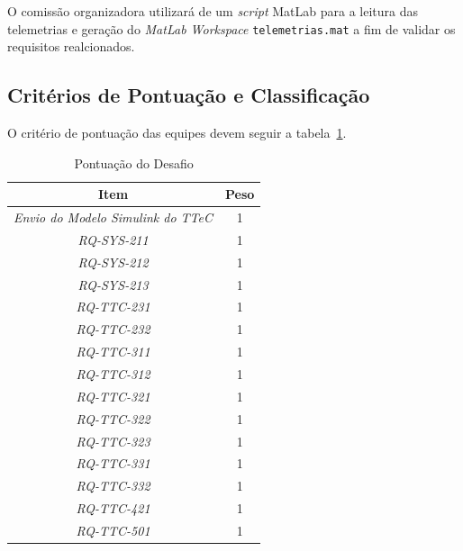 O comissão organizadora utilizará de um \textit{script} MatLab para a leitura das telemetrias e geração do \textit{MatLab Workspace} \verb|telemetrias.mat| a fim de validar os requisitos realcionados. 

\subsection{Critérios de Pontuação e Classificação}

O critério de pontuação das equipes devem seguir a tabela~\ref{tab:classificacao}.

\begin{table}[H]
\centering
\begin{tabular}{c|c}
\hline
\multicolumn{1}{c|}{\textbf{Item}}        & \textbf{Peso} \\ \hline
\textit{Envio do Modelo Simulink do TTeC} & 1             \\
\textit{RQ-SYS-211}                       & 1          \\
\textit{RQ-SYS-212}                       & 1          \\
\textit{RQ-SYS-213}                       & 1          \\
\textit{RQ-TTC-231}                       & 1          \\
\textit{RQ-TTC-232}                       & 1          \\
\textit{RQ-TTC-311}                       & 1          \\
\textit{RQ-TTC-312}                       & 1          \\
\textit{RQ-TTC-321}                       & 1          \\
\textit{RQ-TTC-322}                       & 1          \\
\textit{RQ-TTC-323}                       & 1          \\
\textit{RQ-TTC-331}                       & 1          \\
\textit{RQ-TTC-332}                       & 1          \\
\textit{RQ-TTC-421}                       & 1          \\
\textit{RQ-TTC-501}                       & 1          \\ \hline
\end{tabular}%
\caption{Pontuação do Desafio}
\label{tab:classificacao}
\end{table}


